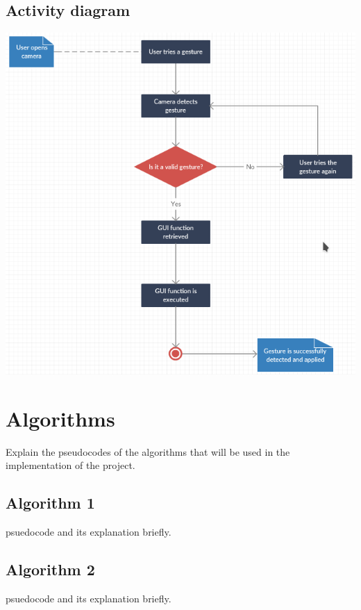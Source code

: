 \documentclass{scrreprt}
\begin{document}
\section{Activity diagram}
\begin{center}
    \includegraphics[scale=0.8]{activitydiagram.png}
\end{center}

\chapter{Algorithms}
Explain the pseudocodes of the algorithms that will be used in the implementation of the project.
\section{Algorithm 1}
psuedocode and its explanation briefly.
\section{Algorithm 2}
psuedocode and its explanation briefly.
\begin{thebibliography}{999}

\bibitem{} 
\bibitem{}

\bibitem{} 

\bibitem{} 

\bibitem{} 

\bibitem{} 



\end{thebibliography}
\end{document}
